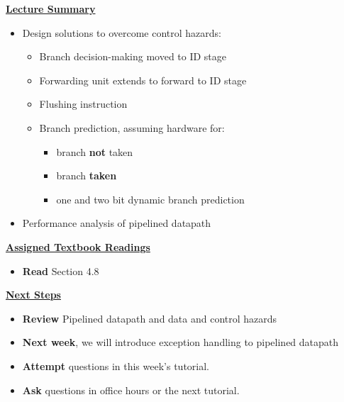 \begin{frame}[fragile]
 \underline{\textbf{Lecture Summary}}
 \begin{itemize}
\item Design solutions to overcome control hazards:

\begin{itemize}
\item Branch decision-making moved to ID stage
    \item Forwarding unit extends to forward to ID stage

\item Flushing instruction 
\item Branch prediction, assuming hardware for: 
\begin{itemize}
    \item branch \textbf{not} taken 
\item branch \textbf{taken}
\item one and two bit dynamic branch prediction
\end{itemize}
    \end{itemize}
\item Performance analysis of pipelined datapath
\end{itemize}
 \underline{\textbf{Assigned Textbook Readings}}
\begin{itemize}
     \item \textbf{Read} Section 4.8 %
     \end{itemize}
    \underline{\textbf{Next Steps}}
    \begin{itemize}
     \item \textbf{Review} Pipelined datapath and data and control hazards 
\item \textbf{Next week}, we will introduce exception handling to pipelined datapath
\item \textbf{Attempt} questions in this week's tutorial. 
    \item \textbf{Ask} questions in office hours or the next tutorial.
 \end{itemize}

\end{frame}


